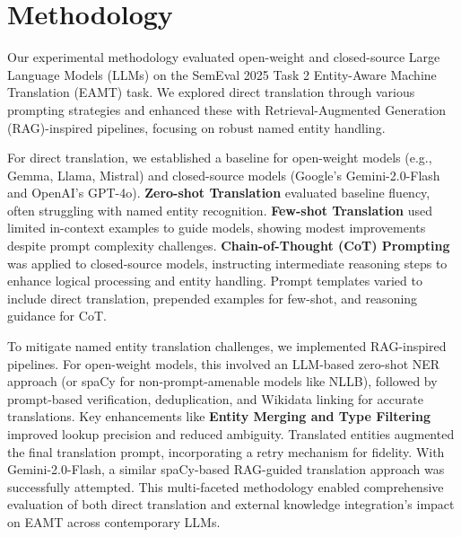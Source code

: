 \documentclass{ecai}
\begin{document}
\section{Methodology}
\label{sec:methodology}
Our experimental methodology evaluated open-weight and closed-source Large Language Models (LLMs) on the SemEval 2025 Task 2 Entity-Aware Machine Translation (EAMT) task. 
We explored direct translation through various prompting strategies and enhanced these with Retrieval-Augmented Generation (RAG)-inspired pipelines, focusing on robust named entity handling.

For direct translation, we established a baseline for open-weight models (e.g., Gemma, Llama, Mistral) and closed-source models (Google's Gemini-2.0-Flash and OpenAI's GPT-4o). 
\textbf{Zero-shot Translation} evaluated baseline fluency, often struggling with named entity recognition. \textbf{Few-shot Translation} used limited in-context examples to guide models, 
showing modest improvements despite prompt complexity challenges. \textbf{Chain-of-Thought (CoT) Prompting} was applied to closed-source models, instructing intermediate reasoning 
steps to enhance logical processing and entity handling. Prompt templates varied to include direct translation, prepended examples for few-shot, and reasoning guidance for CoT.

To mitigate named entity translation challenges, we implemented RAG-inspired pipelines. For open-weight models, this involved an LLM-based zero-shot NER approach 
(or spaCy for non-prompt-amenable models like NLLB), followed by prompt-based verification, deduplication, and Wikidata linking for accurate translations.
Key enhancements like \textbf{Entity Merging and Type Filtering} improved lookup precision and reduced ambiguity. Translated entities augmented 
the final translation prompt, incorporating a retry mechanism for fidelity. With Gemini-2.0-Flash, a similar spaCy-based RAG-guided translation approach 
was successfully attempted. This multi-faceted methodology enabled comprehensive evaluation of both direct translation and external knowledge 
integration's impact on EAMT across contemporary LLMs.

\end{document}
